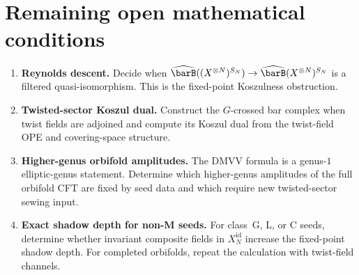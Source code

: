 
\section{Remaining open mathematical conditions}\label{sec:symn-open-problems}

\begin{enumerate}
\item \textbf{Reynolds descent.}
Decide when
$\widehat{\barB}((X^{\otimes N})^{S_N})
\to\widehat{\barB}(X^{\otimes N})^{S_N}$
is a filtered quasi-isomorphism. This is the fixed-point
Koszulness obstruction.

\item \textbf{Twisted-sector Koszul dual.}
Construct the $G$-crossed bar complex when twist fields are adjoined
and compute its Koszul dual from the twist-field OPE and
covering-space structure.

\item \textbf{Higher-genus orbifold amplitudes.}
The DMVV formula is a genus-$1$ elliptic-genus statement. Determine
which higher-genus amplitudes of the full orbifold CFT are fixed by
seed data and which require new twisted-sector sewing input.

\item \textbf{Exact shadow depth for non-M seeds.}
For class~G, L, or C seeds, determine whether invariant composite
fields in $X_N^{\mathrm{id}}$ increase the fixed-point shadow depth.
For completed orbifolds, repeat the calculation with twist-field
channels.
\end{enumerate}
